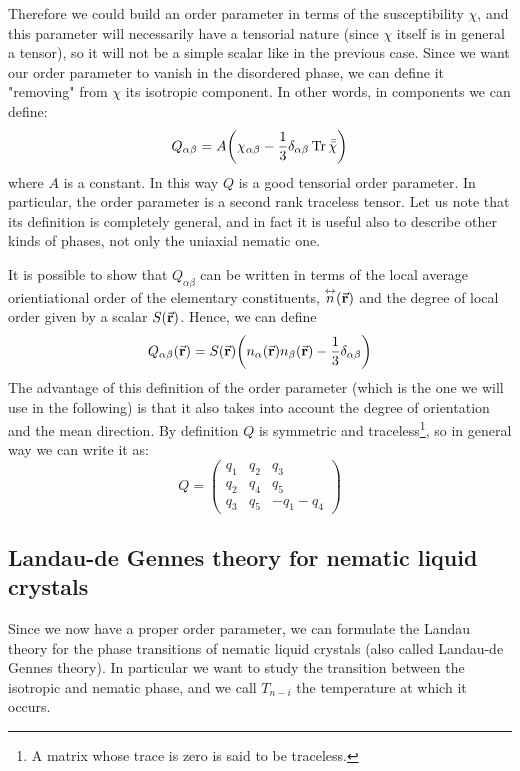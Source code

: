 \documentclass[../main/main.tex]{subfiles}
\begin{document}
Therefore we could build an order parameter in terms of the susceptibility \( \chi  \), and this parameter will necessarily have a tensorial nature (since \( \chi  \) itself is in general a tensor), so it will not be a simple scalar like in the previous case. Since we want our order parameter to vanish in the disordered phase, we can define it "removing" from \( \chi  \) its isotropic component. In other words, in components we can define:
\begin{equation}
  Q_{\alpha \beta } = A \qty(\chi _{\alpha \beta } - \frac{1}{3} \delta _{\alpha \beta }\Tr \bar{\bar{\chi } }  )
\end{equation}
where \( A \) is a constant. In this way \( Q \) is a good tensorial order parameter. In particular, the order parameter is a second rank traceless tensor. Let us note that its definition is completely general, and in fact it is useful also to describe other kinds of phases, not only the uniaxial nematic one.

 It is possible to show that \(   Q_{\alpha \beta }  \) can be written in terms of the local average orientiational order of the elementary constituents, \(  \overset{\leftrightarrow}{n} (\va{r}) \) and the degree of local order given by a scalar \( S(\va{r}) \). Hence, we can define
\begin{equation}
  Q_{\alpha \beta } (\va{r}) = S (\va{r}) \qty(n_{\alpha } (\va{r}) n_{\beta } (\va{r}) - \frac{1}{3}\delta _{\alpha \beta })
\end{equation}
The advantage of this definition of the order parameter (which is the one we will use in the following) is that it also takes into account the degree of orientation and the mean direction.
By definition \( Q \) is symmetric and traceless\footnote{A matrix whose trace is zero is said to be traceless.}, so in general way we can write it as:
\begin{equation}
  Q  =
  \begin{pmatrix}
  q_1   & q_2  & q_3 \\
  q_2   & q_4  & q_5 \\
  q_3   & q_5  & -q_1-q_4
  \end{pmatrix}
\end{equation}



\subsection{Landau-de Gennes theory for nematic liquid crystals}
Since we now have a proper order parameter, we can formulate the Landau theory for the phase transitions of nematic liquid crystals (also called Landau-de Gennes theory). In particular we want to study the transition between the isotropic and nematic phase, and we call \( T_{n-i} \) the temperature at which it occurs.
\end{document}
